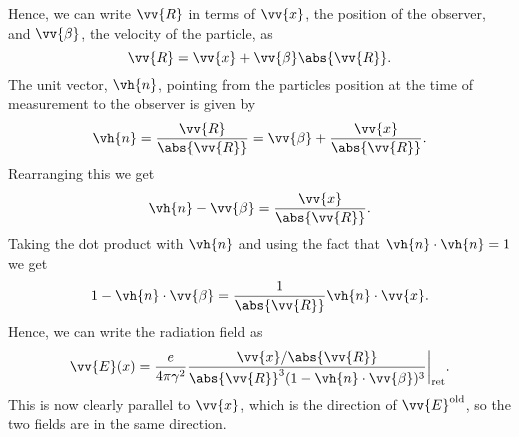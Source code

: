 \documentclass[fleqn]{NotesClass}
\newcommand*{\ret}{{\text{ret}}}
\begin{document}
    Hence, we can write \(\vv{R}\) in terms of \(\vv{x}\), the position of the observer, and \(\vv{\beta}\), the velocity of the particle, as
    \begin{equation}
        \vv{R} = \vv{x} + \vv{\beta} \abs{\vv{R}}.
    \end{equation}
    The unit vector, \(\vh{n}\), pointing from the particles position at the time of measurement to the observer is given by
    \begin{equation}
        \vh{n} = \frac{\vv{R}}{\abs{\vv{R}}} = \vv{\beta} + \frac{\vv{x}}{\abs{\vv{R}}}.
    \end{equation}
    Rearranging this we get
    \begin{equation}
        \vh{n} - \vv{\beta} = \frac{\vv{x}}{\abs{\vv{R}}}.
    \end{equation}
    Taking the dot product with \(\vh{n}\) and using the fact that \(\vh{n} \cdot \vh{n} = 1\) we get
    \begin{equation}
        1 - \vh{n} \cdot \vv{\beta} = \frac{1}{\abs{\vv{R}}} \vh{n} \cdot \vv{x}.
    \end{equation}
    Hence, we can write the radiation field as
    \begin{equation}
        \vv{E}(x) = \frac{e}{4\pi \gamma^2} \frac{\vv{x}/\abs{\vv{R}}}{\abs{\vv{R}}^3(1 - \vh{n} \cdot \vv{\beta})^3} \bigg|_{\ret}.
    \end{equation}
    This is now clearly parallel to \(\vv{x}\), which is the direction of \(\vv{E}^{\text{old}}\), so the two fields are in the same direction.
    
\end{document}
